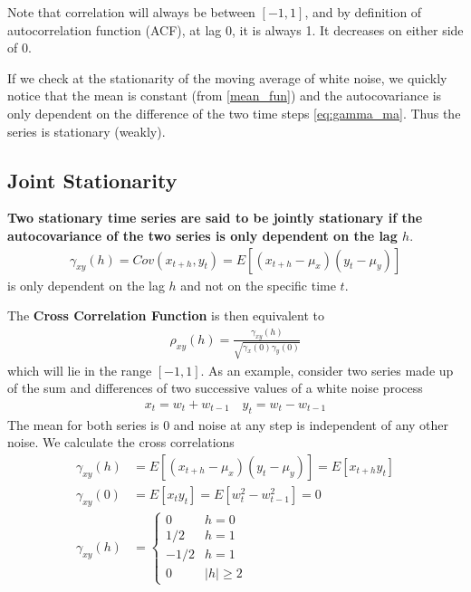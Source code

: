 \documentclass[../../time_series_notes.tex]{subfiles}
\begin{document}
Note that correlation will always be between $[-1,1]$, and by definition of autocorrelation function (ACF), at lag 0, it is always 1. It decreases on either side of 0.

If we check at the stationarity of the moving average of white noise, we quickly notice that the mean is constant (from \ref{mean_fun}) and the autocovariance is only dependent on the difference of the two time steps \eqref{eq:gamma_ma}. Thus the series is stationary (weakly).

\subsection{Joint Stationarity}
\textbf{Two stationary time series are said to be jointly stationary if the autocovariance of the two series is only dependent on the lag $h$}.\newline
\begin{align*}
    \gamma_{xy}(h) = Cov(x_{t+h}, y_{t}) = E[(x_{t+h} - \mu_{x})(y_{t} - \mu_{y})]
\end{align*}
is only dependent on the lag $h$ and not on the specific time $t$.\newline

The \textbf{Cross Correlation Function} is then equivalent to
\begin{align*}
    \rho_{xy}(h) = \frac{\gamma_{xy}(h)}{\sqrt{\gamma_{x}(0) \gamma_{y}(0)}}
\end{align*}
which will lie in the range $[-1,1]$. As an example, consider two series made up of the sum and differences of two successive values of a white noise process
\begin{align*}
    x_{t} = w_{t} + w_{t-1} \quad y_{t} = w_{t} - w_{t-1}
\end{align*}
The mean for both series is $0$ and noise at any step is independent of any other noise. We calculate the cross correlations
\begin{align*}
    \gamma_{xy}(h) &= E[(x_{t+h} - \mu_{x})(y_{t} - \mu_{y})] = E[x_{t+h}y_{t}]\\
    \gamma_{xy}(0) &= E[x_{t}y_{t}] = E[w_{t}^{2} - w_{t-1}^{2}] = 0\\
    \gamma_{xy}(h) &= \begin{cases} 0 &\mbox{$h = 0$}\\ 1/2 &\mbox{$h=1$}\\ -1/2 &\mbox{$h=1$}\\ 0 &\mbox{$\lvert h \rvert \geq 2$} \end{cases}
\end{align*}
\end{document}
